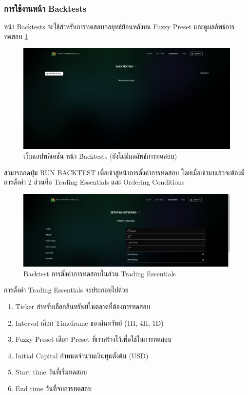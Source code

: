 \subsubsection{การใช้งานหน้า Backtests}
หน้า Backtests จะใช้สำหรับการทดสอบกลยุทธ์ย้อนหลังบน Fuzzy Preset และดูผลลัพธ์การทดสอบ \ref{fig:backtest-no-result}
\begin{figure}[ht]
    \centering
    \includegraphics[width=\textwidth]{images/web-tuts/backtest-no-result.PNG}
    \caption{เว็บแอปพลิเคชัน หน้า Backtests (ยังไม่มีผลลัพธ์การทดสอบ)}
    \label{fig:backtest-no-result}
\end{figure}
\FloatBarrier
สามารถกดปุ่ม RUN BACKTEST เพื่อเข้าสู่หน้าการตั้งค่าการทดสอบ โดยเมื่อเข้ามาแล้วจะต้องมีการตั้งค่า 2 ส่วนคือ Trading Essentials และ Ordering Conditions
\begin{figure}[ht]
    \centering
    \includegraphics[width=\textwidth]{images/web-tuts/backtest-setup-trade-ess.PNG}
    \caption{Backtest การตั้งค่าการทดสอบในส่วน Trading Essentials}
    \label{fig:backtest-setup-trade-ess}
\end{figure}
\FloatBarrier
การตั้งค่า Trading Essentials จะประกอบไปด้วย
\begin{enumerate}
    \overfullrule=0pt
    \item Ticker สำหรับเลือกสินทรัพย์ในตลาดที่ต้องการทดสอบ
    \item Interval เลือก Timeframe ของสินทรัพย์ (1H, 4H, 1D)
    \item Fuzzy Preset เลือก Preset ที่เราสร้างไว้เพื่อใช้ในการทดสอบ
    \item Initial Capital กำหนดจำนวนเงินทุนตั้งต้น (USD)
    \item Start time วันที่เริ่มทดสอบ
    \item End time วันที่จบการทดสอบ
\end{enumerate}
